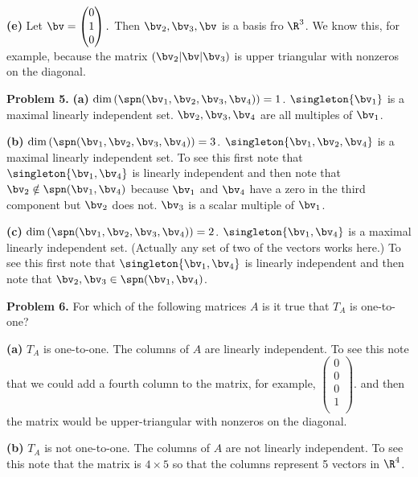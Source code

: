 \documentclass[oneside,12pt]{amsart}
\begin{document}
\bigskip

\textbf{(e)} Let
$\bv =
\begin{pmatrix}
0 \\ 1 \\0
\end{pmatrix}.
$
Then $\bv_2,\bv_3,\bv$ is a basis fro $\R^3$. We know this, for example, because
the matrix $\left(\bv_2 \vert \bv \vert \bv_3 \right)$ is upper triangular with
nonzeros on the diagonal.

\bigskip

\newpage

\textbf{Problem 5.}
\textbf{(a)} $\dim\left(\spn(\bv_1,\bv_2,\bv_3,\bv_4)\right)=1$.
$\singleton{\bv_1}$ is a maximal linearly independent set. $\bv_2,\bv_3,\bv_4$
are all multiples of $\bv_1$.


\bigskip

\textbf{(b)} $\dim\left(\spn(\bv_1,\bv_2,\bv_3,\bv_4)\right)=3$.
$\singleton{\bv_1,\bv_2,\bv_4}$ is a maximal linearly independent set. To
see this first note that $\singleton{\bv_1,\bv_4}$ is linearly independent
and then note that $\bv_2\notin\spn(\bv_1,\bv_4)$ because $\bv_1$ and $\bv_4$
have a zero in the third component but $\bv_2$ does not. $\bv_3$ is a scalar
multiple of $\bv_1$.

\bigskip

\textbf{(c)} $\dim\left(\spn(\bv_1,\bv_2,\bv_3,\bv_4)\right)=2$.
$\singleton{\bv_1,\bv_4}$ is a maximal linearly independent set. (Actually
any set of two of the vectors works here.) To
see this first note that $\singleton{\bv_1,\bv_4}$ is linearly independent
and then note that $\bv_2,\bv_3\in\spn(\bv_1,\bv_4)$.

\bigskip

\textbf{Problem 6.} For which of the following matrices $A$ is it true that $T_A$ is one-to-one?


\textbf{(a)} $T_A$ is one-to-one. The columns of $A$ are linearly independent.
To see this note that we could add a fourth column to the matrix, for example,
$
\begin{pmatrix}
0  \\
0  \\
0  \\
1  \\
\end{pmatrix}.
$
and then the matrix would be upper-triangular with nonzeros on the diagonal.


\bigskip

\textbf{(b)} $T_A$ is not one-to-one. The columns of $A$ are not linearly
independent. To see this note that the matrix is $4\times 5$ so that the
columns represent 5 vectors in $\R^4$.
\end{document}
